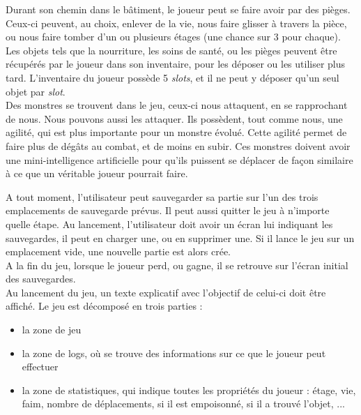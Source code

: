 \documentclass[11pt]{report}
\begin{document}
	Durant son chemin dans le bâtiment, le joueur peut se faire avoir par des pièges. Ceux-ci peuvent, au choix, enlever de la vie, nous faire glisser à travers la pièce, ou nous faire tomber d'un ou plusieurs étages (une chance sur 3 pour chaque).\\
	Les objets tels que la nourriture, les soins de santé, ou les pièges peuvent être récupérés par le joueur dans son inventaire, pour les déposer ou les utiliser plus tard. L'inventaire du joueur possède 5 \emph{slots}, et il ne peut y déposer qu'un seul objet par \emph{slot}.\\
	Des monstres se trouvent dans le jeu, ceux-ci nous attaquent, en se rapprochant de nous. Nous pouvons aussi les attaquer. Ils possèdent, tout comme nous, une agilité, qui est plus importante pour un monstre évolué. Cette agilité permet de faire plus de dégâts au combat, et de moins en subir. Ces monstres doivent avoir une mini-intelligence artificielle pour qu'ils puissent se déplacer de façon similaire à ce que un véritable joueur pourrait faire.
	
	\vspace{12pt}

	A tout moment, l'utilisateur peut sauvegarder sa partie sur l'un des trois emplacements de sauvegarde prévus. Il peut aussi quitter le jeu à n'importe quelle étape. Au lancement, l'utilisateur doit avoir un écran lui indiquant les sauvegardes, il peut en charger une, ou en supprimer une. Si il lance le jeu sur un emplacement vide, une nouvelle partie est alors crée.\\
	A la fin du jeu, lorsque le joueur perd, ou gagne, il se retrouve sur l'écran initial des sauvegardes.\\
	Au lancement du jeu, un texte explicatif avec l'objectif de celui-ci doit être affiché. Le jeu est décomposé en trois parties :
	\begin{itemize}
	\item la zone de jeu
	\item la zone de logs, où se trouve des informations sur ce que le joueur peut effectuer
	\item la zone de statistiques, qui indique toutes les propriétés du joueur : étage, vie, faim, nombre de déplacements, si il est empoisonné, si il a trouvé l'objet, ...
	\end{itemize}
	
	
\end{document}
